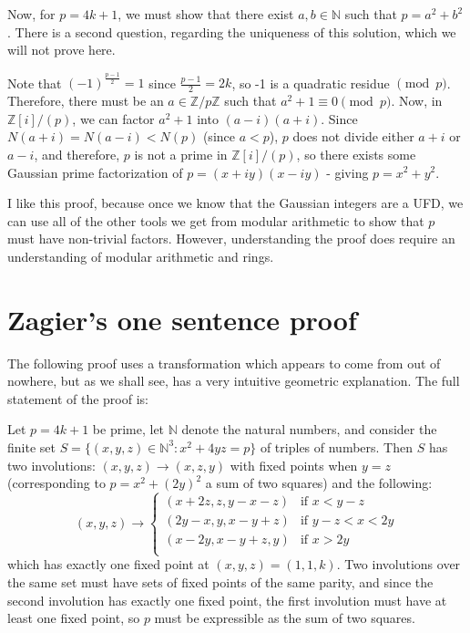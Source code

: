 \documentclass{article}
\begin{document}
Now, for $p=4k+1$, we must show that there exist $a,b \in \mathbb{N}$ such that $p=a^2+b^2$. There
is a second question, regarding the uniqueness of this solution, which we will not prove here.

Note that $(-1)^{\frac{p-1}{2}} = 1$ since $\frac{p-1}{2}=2k$, so -1 is a quadratic
residue $\pmod{p}$. Therefore, there must be an $a \in \mathbb{Z}/p\mathbb{Z}$ such that
$a^2 + 1 \equiv 0 \pmod{p}$. Now, in $\mathbb{Z}[i]/(p)$, we can factor $a^2+1$ into
$(a-i)(a+i)$. Since $N(a+i)=N(a-i)<N(p)$ (since $a < p$), $p$ does not divide either $a+i$ or
$a-i$, and therefore, $p$ is not a prime in $\mathbb{Z}[i]/(p)$, so there exists some Gaussian 
prime factorization of $p = (x+iy)(x-iy)$ - giving $p = x^2+y^2$.

I like this proof, because once we know that the Gaussian integers are a UFD, we can use all of
the other tools we get from modular arithmetic to show that $p$ must have non-trivial factors.
However, understanding the proof does require an understanding of modular arithmetic and rings.

\section{Zagier's one sentence proof}

The following proof uses a transformation which appears to come from out of nowhere, but as we
shall see, has a very intuitive geometric explanation. The full statement of the proof is:

Let $p=4k+1$ be prime, let $\mathbb{N}$ denote the natural numbers, and consider the finite set
$S=\{(x,y,z) \in \mathbb{N}^3: x^2+4yz = p\}$ of triples of numbers. Then $S$ has two 
involutions: $(x,y,z) \to (x,z,y)$ with fixed points when $y=z$ (corresponding to 
$p=x^2+(2y)^2$ a sum of two squares) and the following:
\[ (x,y,z) \to
\left\{
	\begin{array}{ll}
		(x+2z,z,y-x-z)  & \mbox{if } x< y-z \\
		(2y-x,y,x-y+z)  & \mbox{if } y-z < x < 2y \\
		(x-2y,x-y+z,y)  & \mbox{if } x > 2y \\
	\end{array}
\right. \]
which has exactly one fixed point at $(x,y,z) = (1,1,k)$. Two involutions over the same
set must have sets of fixed points of the same parity, and since the second involution
has exactly one fixed point, the first involution must have at least one fixed point, so
$p$ must be expressible as the sum of two squares.
\end{document}
